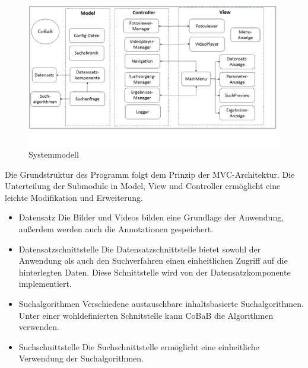 \begin{figure}
\includegraphics[width=1\linewidth]{img/SystemModell}
\caption{Systemmodell}
\label{fig:systemmodell}
\end{figure}
\vspace{10pt}

Die Grundstruktur des Programm folgt dem Prinzip der MVC-Architektur. Die Unterteilung der Submodule in Model, View und Controller ermöglicht eine leichte Modifikation und Erweiterung.

\begin{itemize}
\item Datensatz\newline
Die Bilder und Videos bilden eine Grundlage der Anwendung, außerdem werden auch die Annotationen gespeichert.
\item Datensatzschnittstelle\newline
Die Datensatzschnittstelle bietet sowohl der Anwendung als auch den Suchverfahren einen einheitlichen Zugriff auf die hinterlegten Daten. Diese Schnittstelle wird von der Datensatzkomponente implementiert.
\item Suchalgorithmen\newline
Verschiedene austauschbare inhaltsbasierte Suchalgorithmen. Unter einer wohldefinierten Schnitstelle kann CoBaB die Algorithmen verwenden.
\item Suchschnittstelle\newline
Die Suchschnittstelle ermöglicht eine einheitliche Verwendung der Suchalgorithmen.
\end{itemize}

